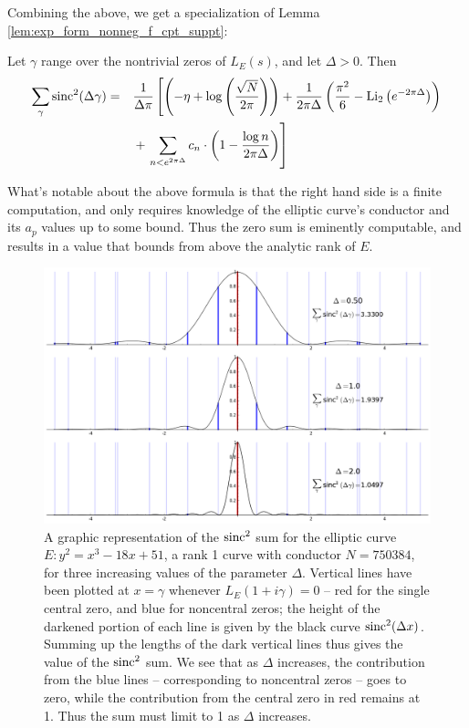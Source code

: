Combining the above, we get a specialization of Lemma \ref{lem:exp_form_nonneg_f_cpt_suppt}:
\begin{corollary}
Let $\gamma$ range over the nontrivial zeros of $L_E(s)$, and let $\Delta > 0$. Then
\begin{align}\label{eqn:sincsquared_sum}
\sum_{\gamma} \text{sinc}^2(\Delta \gamma) = \quad &\frac{1}{\Delta \pi}\left[\left(-\eta + \log\left(\frac{\sqrt{N}}{2\pi}\right)\right)+ \frac{1}{2\pi \Delta}\left(\frac{\pi^2}{6} - \text{Li}_2\left(e^{-2\pi \Delta}\right)\right)  \right. \nonumber \\
&+ \left.\sum_{n<e^{2\pi \Delta}} c_n \cdot \left(1-\frac{\log n}{2\pi \Delta}\right)\right]
\end{align}
\end{corollary}

What's notable about the above formula is that the right hand side is a finite computation, and only requires knowledge of the elliptic curve's conductor and its $a_p$ values up to some bound. Thus the zero sum is eminently computable, and results in a value that bounds from above the analytic rank of $E$. \\

\begin{figure}[!h]
    \centering
    \includegraphics[width=1.0\textwidth]{graphics/zero_sum_visualization.png}
    \caption{A graphic representation of the $\text{sinc}^2$ sum for the elliptic curve $E: y^2=x^3-18x+51$, a rank 1 curve with conductor $N=750384$, for three increasing values of the parameter $\Delta$. Vertical lines have been plotted at $x=\gamma$ whenever $L_E(1+i\gamma)=0$ -- red for the single central zero, and blue for noncentral zeros; the height of the darkened portion of each line is given by the black curve $\text{sinc}^2(\Delta x)$. Summing up the lengths of the dark vertical lines thus gives the value of the $\text{sinc}^2$ sum. We see that as $\Delta$ increases, the contribution from the blue lines -- corresponding to noncentral zeros -- goes to zero, while the contribution from the central zero in red remains at 1. Thus the sum must limit to 1 as $\Delta$ increases.}
    \label{fig:zero_sum_visualization}
\end{figure}

